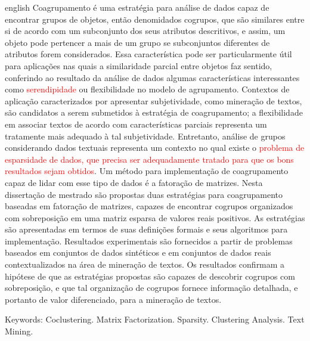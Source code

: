 \documentclass[
    12pt,                %
    oneside,            %
    a4paper,            %
    english,            %
    brazil                %
    ]{abntex2ppgsi}
\begin{document}
\begin{resumo}[Abstract]
\begin{otherlanguage*}{english}
Coagrupamento é uma estratégia para análise de dados capaz de encontrar grupos de objetos, então denomidados cogrupos, que são similares entre si de acordo com um subconjunto dos seus atributos descritivos, e assim, um objeto pode pertencer a mais de um grupo se subconjuntos diferentes de atributos forem considerados. Essa característica pode ser particularmente útil para aplicações nas quais a similaridade parcial entre objetos faz sentido, conferindo ao resultado da análise de dados algumas características interessantes como \textcolor{red}{serendipidade} ou flexibilidade no modelo de agrupamento. Contextos de aplicação caracterizados por apresentar subjetividade, como mineração de textos, são candidatos a serem submetidos à estratégia de coagrupamento; a flexibilidade em associar textos de acordo com características parciais representa um tratamente mais adequado à tal subjetividade. Entretanto, análise de grupos considerando dados textuais representa um contexto no qual existe o \textcolor{red}{problema de esparsidade de dados, que precisa ser adequadamente tratado para que os bons resultados sejam obtidos}. Um método para implementação de coagrupamento capaz de lidar com esse tipo de dados é a fatoração de matrizes. Nesta dissertação de mestrado são propostas duas estratégias para coagrupamento baseadas em fatoração de matrizes, capazes de encontrar cogrupos organizados com sobreposição em uma matriz esparsa de valores reais positivos. As estratégias são apresentadas em termos de suas definições formais e seus algoritmos para implementação. Resultados experimentais são fornecidos a partir de problemas baseados em conjuntos de dados sintéticos e em conjuntos de dados reais contextualizados na área de mineração de textos. Os resultados confirmam a hipótese de que as estratégias propostas são capazes de descobrir cogrupos com sobreposição, e que tal organização de cogrupos fornece informação detalhada, e portanto de valor diferenciado, para a mineração de textos.



Keywords: Coclustering. Matrix Factorization. Sparsity. Clustering Analysis. Text Mining.
\end{otherlanguage*}
\end{resumo}

\listoffigures*
\cleardoublepage
\end{document}
